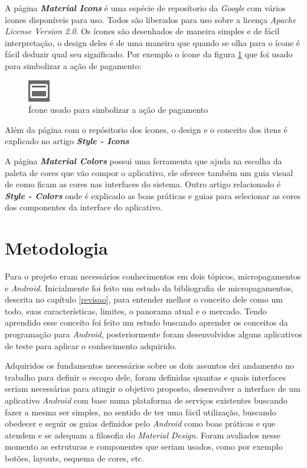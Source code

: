 \documentclass[hidelinks,12pt]{article}
\begin{document}
A p\'agina \textbf{\textit{Material Icons}} \cite{materialicon} \'e uma esp\'ecie de repos\'itorio da \textit{Google} com v\'arios \'icones dispon\'iveis para uso. Todos s\~ao liberados para uso sobre a licen\c{c}a \textit{Apache License Version 2.0}. Os \'icones s\~ao desenhados de maneira simples e de f\'acil interpreta\c{c}\~ao, o design deles \'e de uma maneira que quando se olha para o \'icone \'e f\'acil deduzir qual seu significado. Por exemplo o \'icone da figura \ref{icon_pay} que foi usado para simbolizar a a\c{c}\~ao de pagamento:
	\begin{figure}[h]
		\centering
		\includegraphics{pay_action_white}
		\caption{\'Icone usado para simbolizar a a\c{c}\~ao de pagamento}
		\label{icon_pay}
	\end{figure}

	Al\'em da p\'agina com o rep\'ositorio dos \'icones, o design e o conceito dos itens \'e explicado no artigo \textbf{\textit{Style - Icons}} \cite{materialiconguide}
	
A p\'agina \textbf{\textit{Material Colors}} \cite{materialcolors} possui uma ferramenta \cite{materialcolorpallete} que ajuda na escolha da paleta de cores que v\~ao compor o aplicativo, ele oferece tamb\'em um guia visual de como ficam as cores nas interfaces do sistema. Outro artigo relacionado \'e \textbf{\textit{Style - Colors}} \cite{materialcolors} onde \'e explicado as boas pr\'aticas e guias para selecionar as cores dos componentes da interface do aplicativo.

\newpage
\section{Metodologia}

Para o projeto eram necess\'arios conhecimentos em dois t\'opicos, micropagamentos e \textit{Android}. Inicialmente foi feito um estudo da bibliografia de micropagamentos, descrita no cap\'itulo \ref{revisao}, para entender melhor o conceito dele como um todo, suas caracter\'isticas, limites, o panorama atual e o mercado. Tendo aprendido esse conceito foi feito um estudo buscando aprender os conceitos da programa\c{c}\~ao para \textit{Android}, posteriormente foram desenvolvidos alguns aplicativos de teste para aplicar o conhecimento adquirido.

Adquiridos os fundamentos necess\'arios sobre os dois assuntos dei andamento no trabalho para definir o escopo dele, foram definidas quantas e quais interfaces seriam necess\'arias para atingir o objetivo proposto, desenvolver a interface de um aplicativo \textit{Android} com base numa plataforma de servi\c{c}os existentes buscando fazer a mesma ser simples, no sentido de ter uma f\'acil utiliza\c{c}\~ao, buscando obedecer e seguir os guias definidos pelo \textit{Android} como boas pr\'aticas e que atendem e se adequam a filosofia do \textit{Material Design}. Foram avaliados nesse momento as estruturas e componentes que seriam usados, como por exemplo bot\~oes, layouts, esquema de cores, etc.
\end{document}
